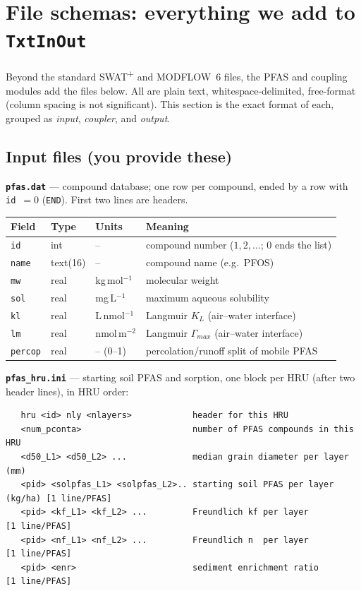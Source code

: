 \documentclass[12pt]{article}
\begin{document}
\section{File schemas: everything we add to \texttt{TxtInOut}}\label{g:schema}
Beyond the standard SWAT\textsuperscript{+} and MODFLOW~6 files, the PFAS and
coupling modules add the files below. All are plain text, whitespace-delimited,
free-format (column spacing is not significant). This section is the exact format
of each, grouped as \emph{input}, \emph{coupler}, and \emph{output}.

\subsection{Input files (you provide these)}
\textbf{\texttt{pfas.dat}} --- compound database; one row per compound, ended by a
row with \texttt{id}~$=0$ (\texttt{END}). First two lines are headers.
\begin{table}[ht]\centering\small
\begin{tabularx}{\textwidth}{lllX}
\toprule
Field & Type & Units & Meaning \\ \midrule
\texttt{id} & int & -- & compound number ($1,2,\ldots$; $0$ ends the list) \\
\texttt{name} & text(16) & -- & compound name (e.g.\ PFOS) \\
\texttt{mw} & real & kg\,mol$^{-1}$ & molecular weight \\
\texttt{sol} & real & mg\,L$^{-1}$ & maximum aqueous solubility \\
\texttt{kl} & real & L\,nmol$^{-1}$ & Langmuir $K_L$ (air--water interface) \\
\texttt{lm} & real & nmol\,m$^{-2}$ & Langmuir $\Gamma_{max}$ (air--water interface) \\
\texttt{percop} & real & -- (0--1) & percolation/runoff split of mobile PFAS \\
\bottomrule
\end{tabularx}
\end{table}

\textbf{\texttt{pfas\_hru.ini}} --- starting soil PFAS and sorption, one block per
HRU (after two header lines), in HRU order:
\begin{verbatim}
   hru <id> nly <nlayers>            header for this HRU
   <num_pconta>                      number of PFAS compounds in this HRU
   <d50_L1> <d50_L2> ...             median grain diameter per layer (mm)
   <pid> <solpfas_L1> <solpfas_L2>.. starting soil PFAS per layer (kg/ha) [1 line/PFAS]
   <pid> <kf_L1> <kf_L2> ...         Freundlich kf per layer            [1 line/PFAS]
   <pid> <nf_L1> <nf_L2> ...         Freundlich n  per layer            [1 line/PFAS]
   <pid> <enr>                       sediment enrichment ratio          [1 line/PFAS]
\end{verbatim}
\end{document}
